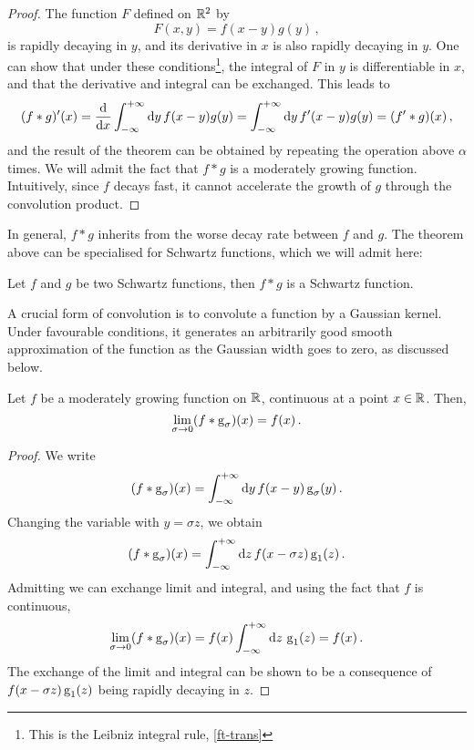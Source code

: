 \begin{proof}
  The function $F$ defined on $\mathbb{R}^2$ by
  \begin{equation}
    F(x,y)=f(x-y)g(y)\,,
  \end{equation}
  is rapidly decaying in $y$, and its derivative in $x$ is also rapidly decaying in $y$.
  One can show that under these conditions\footnote{This is the Leibniz integral rule,
  \cf\cref{ft-trans}}, the integral of $F$ in $y$ is differentiable in $x$, and that the
  derivative and integral can be exchanged. This leads to
  \begin{equation}
    (f\ast g)'(x)=\frac{\mathrm{d}}{\mathrm{d} x}\int_{-\infty}^{+\infty}\mathrm{d}{y}\,f(x-y)g(y)
    =\int_{-\infty}^{+\infty}\mathrm{d}{y}\,f'(x-y)g(y)=(f'\ast g)(x)\,,
  \end{equation}
  and the result of the theorem can be obtained by repeating the operation above $\alpha$
  times. We will admit the fact that $f\ast g$ is a moderately growing function.
  Intuitively, since $f$ decays fast, it cannot accelerate the growth of $g$ through the
  convolution product.
\end{proof}
In general, $f\ast g$ inherits from the worse decay rate between $f$ and $g$. The theorem
above can be specialised for Schwartz functions, which we will admit here:
\begin{proposition}
  Let $f$ and $g$ be two Schwartz functions, then $f\ast g$ is a Schwartz function.
\end{proposition}
A crucial form of convolution is to convolute a function by a Gaussian kernel. Under
favourable conditions, it generates an arbitrarily good smooth approximation of the
function as the Gaussian width goes to zero, as discussed below.
\begin{theorem}
  \label{thm:gaussian-unit}
  Let $f$ be a moderately growing function on $\mathbb{R}$, continuous at a point $x\in\mathbb{R}$. Then,
  \begin{equation}
    \lim_{\sigma\to 0}(f\ast \operatorname{g}_{\sigma})(x)=f(x)\,.
  \end{equation}
\end{theorem}
\begin{proof}
  We write
  \begin{equation}
    (f\ast \operatorname{g}_{\sigma})(x)=\int_{-\infty}^{+\infty}\mathrm{d}{y}\,f(x-y)\operatorname{g}_{\sigma}(y)\,.
  \end{equation}
  Changing the variable with $y=\sigma z$, we obtain
  \begin{equation}
    (f\ast \operatorname{g}_{\sigma})(x)=\int_{-\infty}^{+\infty}\mathrm{d}{z}\,f(x-\sigma z)\operatorname{g}_{1}(z)\,.
  \end{equation}
  Admitting we can exchange limit and integral, and using the fact that $f$ is continuous,
  \begin{equation}
    \lim_{\sigma\to 0}(f\ast \operatorname{g}_{\sigma})(x)=f(x)\int_{-\infty}^{+\infty}\mathrm{d}{z}\,\operatorname{g}_{1}(z)=f(x)\,.
  \end{equation}
  The exchange of the limit and integral can be shown to be a consequence of $f(x-\sigma
  z)\operatorname{g}_{1}(z)$ being rapidly decaying in $z$.
\end{proof}
